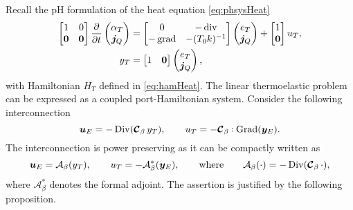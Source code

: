 Recall the pH formulation of the heat equation \eqref{eq:phsysHeat}
\begin{equation}
\begin{aligned}
\begin{bmatrix}
1 & 0 \\
\bm{0} & \bm{0} \\
\end{bmatrix}
\diffp{}{t}
\begin{pmatrix}
\alpha_T \\
\bm{j}_Q \\
\end{pmatrix} &= 
\begin{bmatrix}
0 & -\div \\
-\grad & -(T_0 k)^{-1} \\
\end{bmatrix}
\begin{pmatrix}
e_T \\
\bm{j}_Q \\
\end{pmatrix} + 
\begin{bmatrix}
1 \\
\bm{0} \\
\end{bmatrix} u_T, \\
y_T &= \begin{bmatrix}
1 & \bm{0} \\
\end{bmatrix} \begin{pmatrix}
e_T \\
\bm{j}_Q \\
\end{pmatrix},
\end{aligned}
\end{equation} 
with Hamiltonian $H_T$ defined in \eqref{eq:hamHeat}. The linear thermoelastic problem can be expressed as a coupled port-Hamiltonian system.  Consider the following interconnection
\begin{equation}
\bm{u}_E = - \Div(\bm{\mathcal{C}}_\beta \, y_T), \qquad
u_T = - \bm{\mathcal{C}}_\beta \cddot\Grad(\bm{y}_E). 
\end{equation}
The interconnection is power preserving as it can be compactly written as 
\begin{equation}\label{eq:coup_operThElas}
\bm{u}_E = \mathcal{A}_\beta(y_T), \qquad u_T = - \mathcal{A}_\beta^*(\bm{y}_E), \qquad \text{where} \qquad  \mathcal{A}_\beta(\cdot) = - \operatorname*{Div}(\bm{\mathcal{C}}_\beta \, \cdot),
\end{equation}
where $\mathcal{A}_\beta^*$ denotes the formal adjoint. The assertion is justified by the following proposition.

